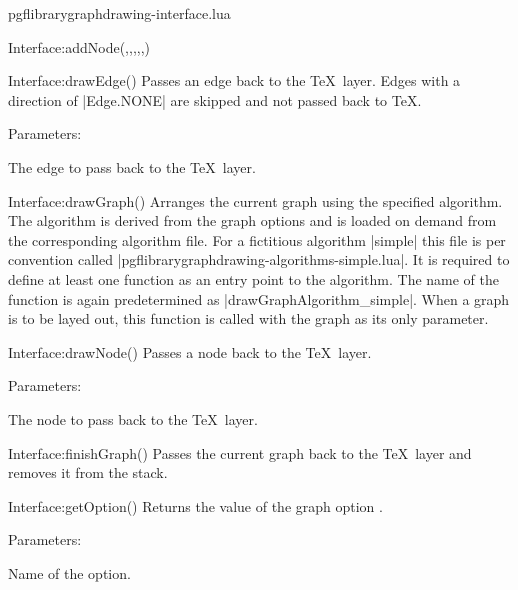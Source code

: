 \begin{filedescription}{pgflibrarygraphdrawing-interface.lua}
\begin{luacommand}{{Interface:addNode}(,,,,,)}
\end{luacommand}
\begin{luacommand}{{Interface:drawEdge}()}
Passes an edge back to the \TeX\ layer.  Edges with a direction of |Edge.NONE| are skipped and not passed back to \TeX. 

Parameters:
\begin{parameterdescription}
	\item[\meta{edge}] The edge to pass back to the \TeX\ layer. 
\end{parameterdescription}



\end{luacommand}
\begin{luacommand}{{Interface:drawGraph}()}
Arranges the current graph using the specified algorithm.  The algorithm is derived from the graph options and is loaded on demand from the corresponding algorithm file. For a fictitious algorithm |simple| this file is per convention called |pgflibrarygraphdrawing-algorithms-simple.lua|. It is required to define at least one function as an entry point to the algorithm. The name of the function is again predetermined as |drawGraphAlgorithm_simple|. When a graph is to be layed out, this function is called with the graph as its only parameter. 



\end{luacommand}
\begin{luacommand}{{Interface:drawNode}()}
Passes a node back to the \TeX\ layer. 

Parameters:
\begin{parameterdescription}
	\item[\meta{node}] The node to pass back to the \TeX\ layer. 
\end{parameterdescription}



\end{luacommand}
\begin{luacommand}{{Interface:finishGraph}()}
Passes the current graph back to the \TeX\ layer and removes it from the stack. 



\end{luacommand}
\begin{luacommand}{{Interface:getOption}()}
Returns the value of the graph option . 

Parameters:
\begin{parameterdescription}
	\item[\meta{name}] Name of the option. 
\end{parameterdescription}



\end{luacommand}
\end{filedescription}
